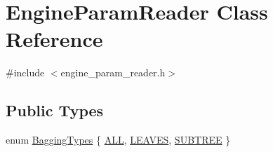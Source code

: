 \hypertarget{classEngineParamReader}{
\section{EngineParamReader Class Reference}
\label{classEngineParamReader}
}


{\ttfamily \#include $<$engine\_\-param\_\-reader.h$>$}

\subsection*{Public Types}
\begin{DoxyCompactItemize}
\item 
enum \hyperlink{classEngineParamReader_ab2ee80aa67ba657beddf852c526e1a3d}{BaggingTypes} \{ \hyperlink{classEngineParamReader_ab2ee80aa67ba657beddf852c526e1a3dad564d072511cbff180a2f017a20eb842}{ALL}, 
\hyperlink{classEngineParamReader_ab2ee80aa67ba657beddf852c526e1a3daa474dec3c26cb72fb2762ce5c9a6ddf0}{LEAVES}, 
\hyperlink{classEngineParamReader_ab2ee80aa67ba657beddf852c526e1a3da84d0e6978fb6ad03ff1095742531abd9}{SUBTREE}
 \}
\end{DoxyCompactItemize}
